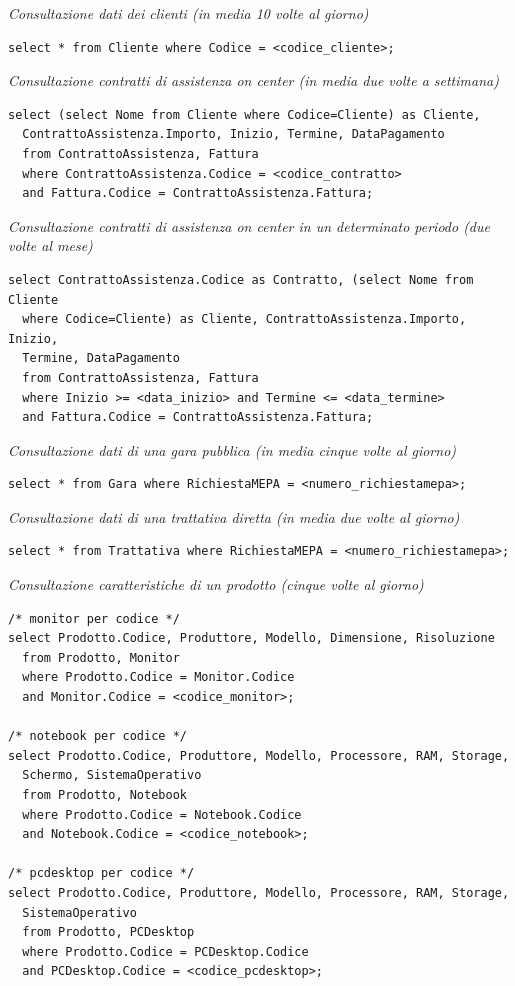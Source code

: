\noindent\textit{Consultazione dati dei clienti (in media 10 volte al giorno)}
\begin{verbatim}
select * from Cliente where Codice = <codice_cliente>;
\end{verbatim}
\vspace{1cm}

\noindent\textit{Consultazione contratti di assistenza on center (in media due volte a settimana)}
\begin{verbatim}
select (select Nome from Cliente where Codice=Cliente) as Cliente,
  ContrattoAssistenza.Importo, Inizio, Termine, DataPagamento
  from ContrattoAssistenza, Fattura
  where ContrattoAssistenza.Codice = <codice_contratto>
  and Fattura.Codice = ContrattoAssistenza.Fattura;
\end{verbatim}
\vspace{1cm}

\noindent\textit{Consultazione contratti di assistenza on center in un determinato periodo (due volte al mese)}
\begin{verbatim}
select ContrattoAssistenza.Codice as Contratto, (select Nome from Cliente
  where Codice=Cliente) as Cliente, ContrattoAssistenza.Importo, Inizio,
  Termine, DataPagamento
  from ContrattoAssistenza, Fattura
  where Inizio >= <data_inizio> and Termine <= <data_termine>
  and Fattura.Codice = ContrattoAssistenza.Fattura;

\end{verbatim}
\vspace{1cm}

\noindent\textit{Consultazione dati di una gara pubblica (in media cinque volte al giorno)}
\begin{verbatim}
select * from Gara where RichiestaMEPA = <numero_richiestamepa>;
\end{verbatim}
\vspace{1cm}

\noindent\textit{Consultazione dati di una trattativa diretta (in media due volte al giorno)}
\begin{verbatim}
select * from Trattativa where RichiestaMEPA = <numero_richiestamepa>;
\end{verbatim}
\vspace{1cm}

\noindent\textit{Consultazione caratteristiche di un prodotto (cinque volte al giorno)}
\begin{verbatim}
/* monitor per codice */
select Prodotto.Codice, Produttore, Modello, Dimensione, Risoluzione
  from Prodotto, Monitor
  where Prodotto.Codice = Monitor.Codice
  and Monitor.Codice = <codice_monitor>;

/* notebook per codice */
select Prodotto.Codice, Produttore, Modello, Processore, RAM, Storage,
  Schermo, SistemaOperativo
  from Prodotto, Notebook
  where Prodotto.Codice = Notebook.Codice
  and Notebook.Codice = <codice_notebook>;

/* pcdesktop per codice */
select Prodotto.Codice, Produttore, Modello, Processore, RAM, Storage,
  SistemaOperativo
  from Prodotto, PCDesktop
  where Prodotto.Codice = PCDesktop.Codice
  and PCDesktop.Codice = <codice_pcdesktop>;
\end{verbatim}
\vspace{1cm}

